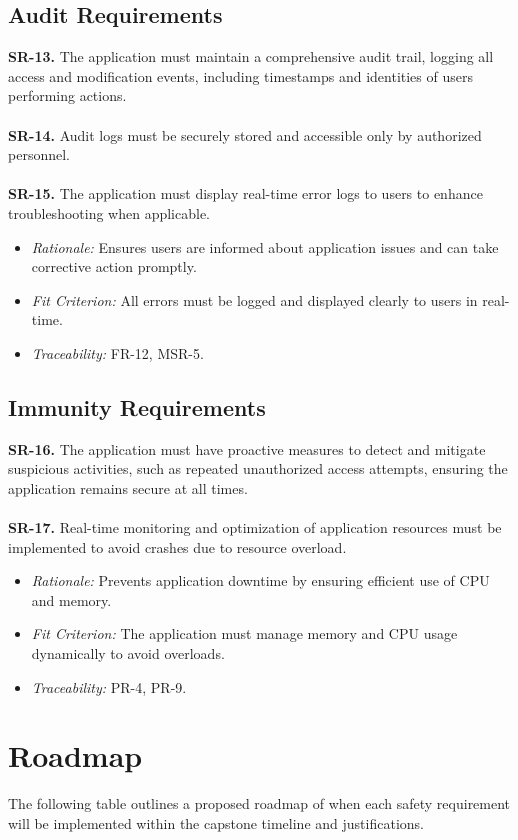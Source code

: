 \documentclass{article}
\begin{document}
\subsection{Audit Requirements}
\textbf{SR-13.} The application must maintain a comprehensive audit trail,
  logging all access and modification events, including timestamps and
  identities of users performing actions. \ \\
\ \\
\textbf{SR-14.} Audit logs must be securely stored and accessible only by
  authorized personnel. \ \\
  \ \\
  \textbf{SR-15.} The application must display real-time 
  error logs to users to enhance troubleshooting when applicable.
    \begin{itemize}
      \item \textit{Rationale:} Ensures users are informed about application issues
      and can take corrective action promptly.
      \item \textit{Fit Criterion:} All errors must be logged and displayed
      clearly to users in real-time.
      \item \textit{Traceability:} FR-12, MSR-5.
    \end{itemize}
  

\subsection{Immunity Requirements}
\textbf{SR-16.} The application must have proactive measures to detect and
  mitigate suspicious activities, such as repeated unauthorized access attempts,
  ensuring the application remains secure at all times. \ \\
  \ \\
  \textbf{SR-17.} Real-time monitoring and optimization of application resources must
  be implemented to avoid crashes due to resource overload.
    \begin{itemize}
      \item \textit{Rationale:} Prevents application downtime by ensuring efficient
      use of CPU and memory.
      \item \textit{Fit Criterion:} The application must manage memory and CPU usage
      dynamically to avoid overloads.
      \item \textit{Traceability:} PR-4, PR-9.
    \end{itemize}

\section{Roadmap}
The following table outlines a proposed roadmap of when each safety requirement
will be implemented within the capstone timeline and justifications.
\end{document}
